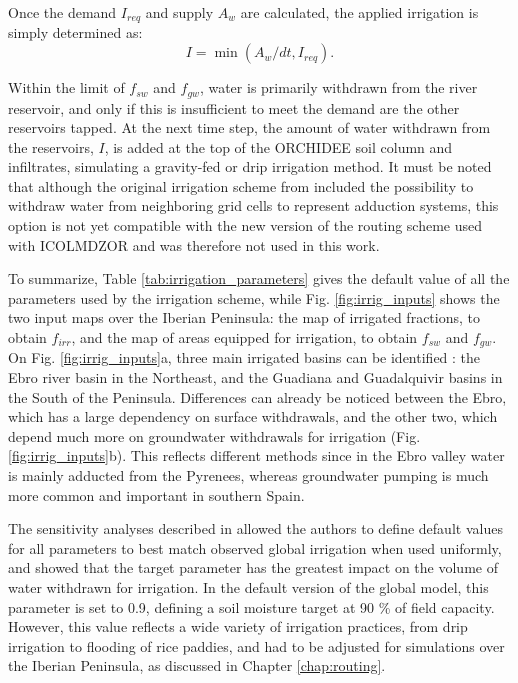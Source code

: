 Once the demand $I_{req}$ and supply $A_w$ are calculated, the applied irrigation is simply  determined as:
\begin{equation}
    I = \min(A_w/dt, I_{req}).
\end{equation}

Within the limit of $f_{sw}$ and $f_{gw}$, water is primarily withdrawn from the river reservoir, and only if this is insufficient to meet the demand are the other reservoirs tapped.
At the next time step, the amount of water withdrawn from the reservoirs, $I$, is added at the top of the ORCHIDEE soil column and infiltrates, simulating a gravity-fed or drip irrigation method.
It must be noted that although the original irrigation scheme from \citet{arboleda-obando_validation_2024} included the possibility to withdraw water from neighboring grid cells to represent adduction systems, this option is not yet compatible with the new version of the routing scheme used with ICOLMDZOR and was therefore not used in this work.

To summarize, Table \ref{tab:irrigation_parameters} gives the default value of all the parameters used by the irrigation scheme, while Fig. \ref{fig:irrig_inputs} shows the two input maps over the Iberian Peninsula: the map of irrigated fractions, to obtain $f_{irr}$, and the map of areas equipped for irrigation, to obtain $f_{sw}$ and $f_{gw}$. On Fig. \ref{fig:irrig_inputs}a, three main irrigated basins can be identified : the Ebro river basin in the Northeast, and the Guadiana and Guadalquivir basins in the South of the Peninsula. Differences can already be noticed between the Ebro, which has a large dependency on surface withdrawals, and the other two, which depend much more on groundwater withdrawals for irrigation (Fig. \ref{fig:irrig_inputs}b). This reflects different methods since in the Ebro valley water is mainly adducted from the Pyrenees, whereas groundwater pumping is much more common and important in southern Spain.

The sensitivity analyses described in \citet{arboleda-obando_validation_2024} allowed the authors to define default values for all parameters to best match observed global irrigation when used uniformly, and showed that the target parameter \betairrig has the greatest impact on the volume of water withdrawn for irrigation.
In the default version of the global model, this parameter is set to 0.9, defining a soil moisture target at 90 \% of field capacity. However, this value reflects a wide variety of irrigation practices, from drip irrigation to flooding of rice paddies, and had to be adjusted for simulations over the Iberian Peninsula, as discussed in Chapter \ref{chap:routing}.

